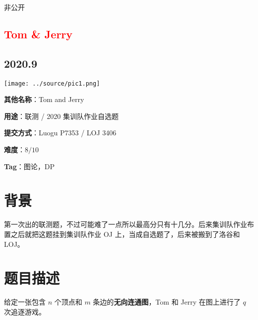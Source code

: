 \documentclass[a4paper,10pt]{article}
\begin{document}
非公开

\newpage

\vspace*{\fill}
\begin{center}

\section{\textcolor{red}{Tom \& Jerry}}

\subsection*{2020.9}

\vspace{10pt}

\texttt{[image: ../source/pic1.png]}

\vspace{10pt}

\textbf{其他名称}：Tom and Jerry

\vspace{10pt}

\textbf{用途}：联测 / 2020 集训队作业自选题

\vspace{10pt}

\textbf{提交方式}：Luogu P7353 / LOJ 3406

\vspace{10pt}

\textbf{难度}：$8/10$

\vspace{10pt}

\textbf{Tag}：图论，DP

\end{center}
\vspace*{\fill}

\newpage

\section*{背景}

第一次出的联测题，不过可能难了一点所以最高分只有十几分。后来集训队作业布置之后就把这题挂到集训队作业 OJ 上，当成自选题了，后来被搬到了洛谷和 LOJ。

\section*{题目描述}

给定一张包含 $n$ 个顶点和 $m$ 条边的\textbf{无向连通图}，Tom 和 Jerry 在图上进行了 $q$ 次追逐游戏。
\end{document}
